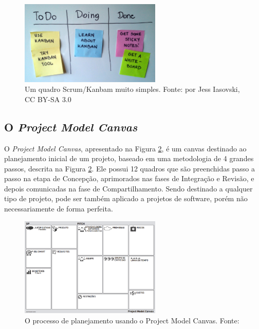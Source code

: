 \documentclass{article}
\newcommand{\othersize}{0.6\textwidth}
\begin{document}
\begin{figure}
    \centering
    \includegraphics[width=\othersize]{imagens/Simple-kanban-board-.jpg}
    \caption{Um quadro Scrum/Kanbam muito simples. Fonte:  por Jess Iasovski, CC BY-SA 3.0 }
    \label{fig:kanbam}
\end{figure}

\subsection{O \textit{Project Model Canvas}}

O \textit{Project Model Canvas}\citep{finocchio:2013}, apresentado na Figura \ref{fig:pmcp}, é um canvas destinado ao planejamento inicial de um projeto, baseado em uma metodologia de 4 grandes passos, descrita na Figura \ref{fig:pmcp}. Ele possui 12 quadros que são preenchidas passo a passo na etapa de Concepção,  aprimorados nas fases de Integração e Revisão, e depois comunicadas na fase de Compartilhamento. Sendo destinado a qualquer tipo de projeto, pode ser também aplicado a projetos de software, porém não necessariamente de forma perfeita.

\begin{figure}
    \centering
    \includegraphics[width=\othersize]{imagens/ProjectMdoel Canvas.png}
    \caption{O processo de planejamento usando o Project Model Canvas. Fonte: \citet{finocchio:2013}}
    \label{fig:pmcp}
\end{figure}
\end{document}
